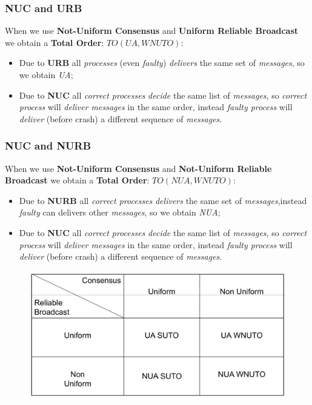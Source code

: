 \documentclass{article}
\begin{document}
\subsubsection{NUC and URB}
When we use \textbf{Not-Uniform Consensus} and \textbf{Uniform Reliable Broadcast} we obtain a \textbf{Total Order}: $TO(UA,WNUTO)$:
\begin{itemize}
\item Due to \textbf{URB} all \emph{processes} (even \emph{faulty}) \emph{delivers} the same set of \emph{messages}, so we obtain \emph{UA};
\item Due to \textbf{NUC} all \emph{correct processes} \emph{decide} the same list of \emph{messages}, so \emph{correct process} will \emph{deliver messages} in the same order, instead \emph{faulty process} will \emph{deliver} (before crash) a different sequence of \emph{messages}.
\end{itemize}

\subsubsection{NUC and NURB}
When we use \textbf{Not-Uniform Consensus} and \textbf{Not-Uniform Reliable Broadcast} we obtain a \textbf{Total Order}: $TO(NUA,WNUTO)$:
\begin{itemize}
\item Due to \textbf{NURB} all \emph{correct processes} \emph{delivers} the same set of \emph{messages},instead \emph{faulty} can delivers other \emph{messages}, so we obtain \emph{NUA};
\item Due to \textbf{NUC} all \emph{correct processes} \emph{decide} the same list of \emph{messages}, so \emph{correct process} will \emph{deliver messages} in the same order, instead \emph{faulty process} will \emph{deliver} (before crash) a different sequence of \emph{messages}.
\end{itemize}
\begin{figure}[H]
  \centering
  \includegraphics[scale=0.35]{cattura60.png}
\end{figure}
\end{document}
